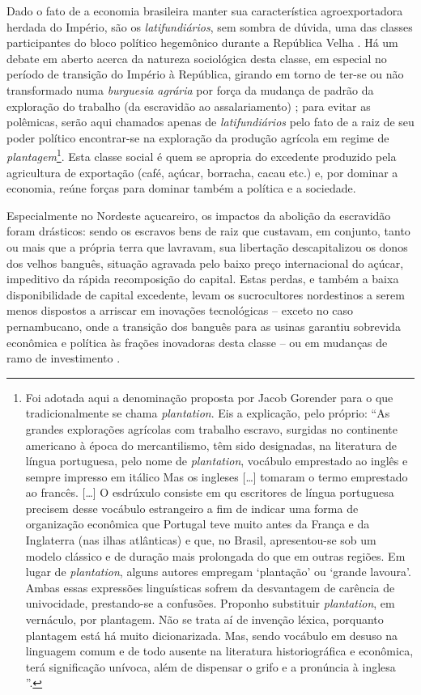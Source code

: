 Dado o fato de a economia brasileira manter sua característica agroexportadora herdada do Império, são os \textit{latifundiários}, sem sombra de dúvida, uma das classes participantes do bloco político hegemônico durante a República Velha \cite{gorender_burguesia_1990,oliveira_emopro_1977,CARONE1970inst}. Há um debate em aberto acerca da natureza sociológica desta classe, em especial no período de transição do Império à República, girando em torno de ter-se ou não transformado numa \textit{burguesia agrária} por força da mudança de padrão da exploração do trabalho (da escravidão ao assalariamento) \cite{gorender_burguesia_1990,oliveira_emopro_1977}; para evitar as polêmicas, serão aqui chamados apenas de \textit{latifundiários} pelo fato de a raiz de seu poder político encontrar-se na exploração da produção agrícola em regime de \textit{plantagem}\footnote{Foi adotada aqui a denominação proposta por Jacob Gorender para o que tradicionalmente se chama \textit{plantation}. Eis a explicação, pelo próprio: ``As grandes explorações agrícolas com trabalho escravo, surgidas no continente americano à época do mercantilismo, têm sido designadas, na literatura de língua portuguesa, pelo nome de \textit{plantation}, vocábulo emprestado ao inglês e sempre impresso em itálico Mas os ingleses [\dots] tomaram o termo emprestado ao francês. [\dots] O esdrúxulo consiste em qu escritores de língua portuguesa precisem desse vocábulo estrangeiro a fim de indicar uma forma de organização econômica que Portugal teve muito antes da França e da Inglaterra (nas ilhas atlânticas) e que, no Brasil, apresentou-se sob um modelo clássico e de duração mais prolongada do que em outras regiões. Em lugar de \textit{plantation}, alguns autores empregam `plantação' ou `grande lavoura'. Ambas essas expressões linguísticas sofrem da desvantagem de carência de univocidade, prestando-se a confusões. Proponho substituir \textit{plantation}, em vernáculo, por plantagem. Não se trata aí de invenção léxica, porquanto plantagem está há muito dicionarizada. Mas, sendo vocábulo em desuso na linguagem comum e de todo ausente na literatura historiográfica e econômica, terá significação unívoca, além de dispensar o grifo e a pronúncia à inglesa \cite[pp.~119-120]{gorender_escracolo_2010}''.}. Esta classe social é quem se apropria do excedente produzido pela agricultura de exportação (café, açúcar, borracha, cacau etc.) e, por dominar a economia, reúne forças para dominar também a política e a sociedade.

Especialmente no Nordeste açucareiro, os impactos da abolição da escravidão foram drásticos: sendo os escravos bens de raiz que custavam, em conjunto, tanto ou mais que a própria terra que lavravam, sua libertação descapitalizou os donos dos velhos banguês, situação agravada pelo baixo preço internacional do açúcar, impeditivo da rápida recomposição do capital. Estas perdas, e também a baixa disponibilidade de capital excedente, levam os sucrocultores nordestinos a serem menos dispostos a arriscar em inovações tecnológicas -- exceto no caso pernambucano, onde a transição dos banguês para as usinas garantiu sobrevida econômica e política às frações inovadoras desta classe -- ou em mudanças de ramo de investimento \cite[p.~153]{CARONE1970inst}. 

